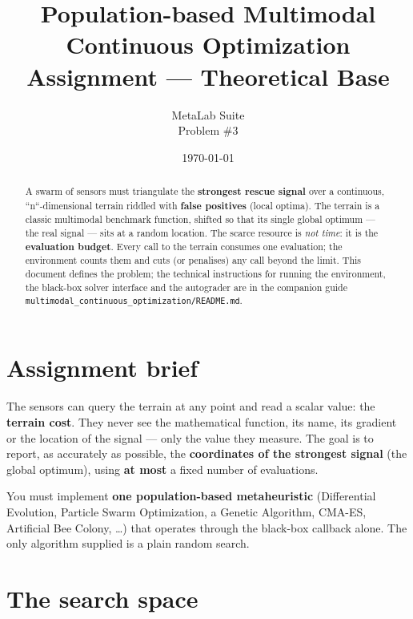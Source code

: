 \documentclass[11pt,a4paper]{article}
\title{%
  \textbf{Population-based Multimodal Continuous Optimization}\\[2mm]
  \large Assignment --- Theoretical Base}
\author{%
  MetaLab Suite\\[1mm]
  \small Problem \#3}
\date{\today}
\begin{document}
\maketitle

\begin{abstract}
\noindent
A swarm of sensors must triangulate the \textbf{strongest rescue signal} over a
continuous, ``n``-dimensional terrain riddled with \textbf{false positives}
(local optima). The terrain is a classic multimodal benchmark function, shifted
so that its single global optimum --- the real signal --- sits at a random
location. The scarce resource is \emph{not time}: it is the
\textbf{evaluation budget}. Every call to the terrain consumes one evaluation;
the environment counts them and cuts (or penalises) any call beyond the limit.
This document defines the problem; the technical instructions for running the
environment, the black-box solver interface and the autograder are in the
companion guide \texttt{multimodal\_continuous\_optimization/README.md}.
\end{abstract}

\tableofcontents

\section{Assignment brief}

The sensors can query the terrain at any point and read a scalar value: the
\textbf{terrain cost}. They never see the mathematical function, its name, its
gradient or the location of the signal --- only the value they measure. The goal
is to report, as accurately as possible, the \textbf{coordinates of the strongest
signal} (the global optimum), using \textbf{at most} a fixed number of
evaluations.

You must implement \textbf{one population-based metaheuristic} (Differential
Evolution, Particle Swarm Optimization, a Genetic Algorithm, CMA-ES, Artificial
Bee Colony, \dots) that operates through the black-box callback alone. The only
algorithm supplied is a plain random search.

\section{The search space}
\end{document}
